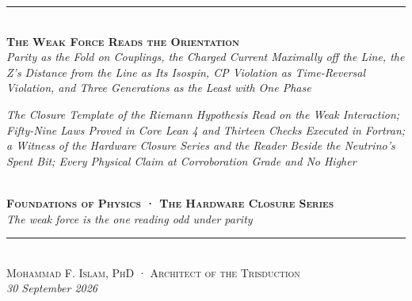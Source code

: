 \documentclass[10pt]{article}
\begin{document}
\begin{center}
{\color{accent}\rule{0.6\textwidth}{0.8pt}}\\[10pt]
{\bfseries\scshape\fontsize{19}{23}\selectfont The Weak Force Reads the
Orientation}\\[7pt]
{\itshape\large Parity as the Fold on Couplings, the Charged Current
Maximally off the Line, the Z's Distance from the Line as Its Isospin,
CP Violation as Time-Reversal Violation, and Three Generations as the
Least with One Phase}\\[6pt]
\parbox{0.86\textwidth}{\centering\small\itshape\color{faint} The
Closure Template of the Riemann Hypothesis Read on the Weak Interaction;
Fifty-Nine Laws Proved in Core Lean 4 and Thirteen Checks Executed in
Fortran; a Witness of the Hardware Closure Series and the Reader Beside
the Neutrino's Spent Bit; Every Physical Claim at Corroboration Grade
and No Higher}\\[8pt]
{\footnotesize\color{accent}\scshape\bfseries Foundations of Physics ·
The Hardware Closure Series}\\[3pt]
{\itshape\color{deep}\small The weak force is the one reading odd under
parity}\\[9pt]
{\color{accent}\rule{0.6\textwidth}{0.8pt}}\\[10pt]
{\scshape Mohammad F. Islam, PhD · Architect of the Trisduction}\\[2pt]

{\itshape\color{faint}\small 30 September 2026}\\[12pt]
\end{center}
\noindent{\color{accent}\rule{\textwidth}{0.6pt}}\\[2pt]
\end{document}
